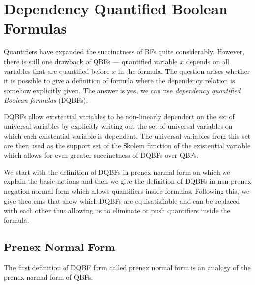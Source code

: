 \documentclass[
  digital, %
  twoside, %
  table,   %
  nolof,     %
  nolot,     %
]{fithesis3}
\theoremstyle{definition}
\theoremstyle{remark}
\begin{document}
\section{Dependency Quantified Boolean Formulas}
Quantifiers have expanded the succinctness of BFs quite considerably. However, there is still one drawback of QBFs --- quantified variable $x$ depends on all variables that are quantified before $x$ in the formula. The question arises whether it is possible to give a definition of formula where the dependency relation is somehow explicitly given. The answer is yes, we can use \emph{dependency quantified Boolean formulas} (DQBFs).

DQBFs allow existential variables to be non-linearly dependent on the set of universal variables by explicitly writing out the set of universal variables on which each existential variable is dependent. The universal variables from this set are then used as the support set of the Skolem function of the existential variable which allows for even greater succinctness of DQBFs over QBFs.  

We start with the definition of DQBFs in prenex normal form on which we explain the basic notions and then we give the definition of DQBFs in non-prenex negation normal form which allows quantifiers inside formulas. Following this, we give theorems that show which DQBFs are equisatisfiable and can be replaced with each other thus allowing us to eliminate or push quantifiers inside the formula.

\subsection{Prenex Normal Form}
The first definition of DQBF form called prenex normal form is an analogy of the prenex normal form of QBFs.
\end{document}
